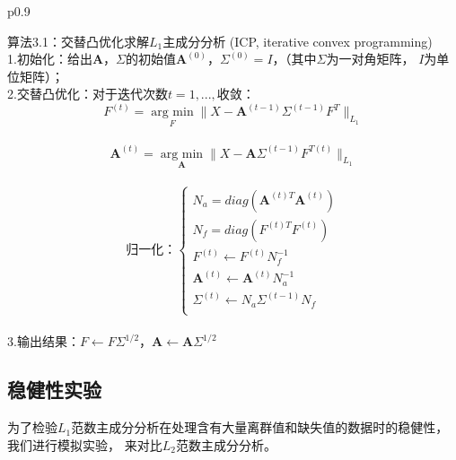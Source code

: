 \begin{table}[H]%
    \centering%
    \begin{tabular}{{p{0.9\columnwidth}}}%
    
    \toprule%
    算法3.1：交替凸优化求解$L_1$主成分分析 (ICP, iterative convex programming) \\
    \midrule%
    1.初始化：给出$\bm{A}$，$\Sigma$的初始值$\bm{A}^{(0)}$，$\Sigma^{(0)} = I$，（其中$\Sigma$为一对角矩阵，
    $I$为单位矩阵）； \\

    2.交替凸优化：对于迭代次数$t = 1, ..., $收敛： \\
    $$F^{(t)} = \underset{F}{\operatorname{arg\ min}} \|X - \bm{A}^{(t-1)}\Sigma^{(t-1)}F^{T}\|_{L_1}$$ \\
    $$\bm{A}^{(t)} = \underset{\bm{A}}{\operatorname{arg\ min}} \|X - \bm{A}\Sigma^{(t-1)}F^{T(t)} \|_{L_1}$$ \\
    \begin{equation*}
        \text{归一化：}\left\{
                    \begin{array}{clr}
                    N_a = diag(\bm{A}^{(t)T}\bm{A}^{(t)})\\
                    N_f = diag(F^{(t)T}F^{(t)})\\
                    F^{(t)} \leftarrow F^{(t)}N_f^{-1}\\
                    \bm{A}^{(t)}\leftarrow \bm{A}^{(t)}N_a^{-1}\\
                    \Sigma^{(t)} \leftarrow N_a\Sigma^{(t-1)}N_f\\
                    \end{array}
        \right.
    \end{equation*} \\

    3.输出结果：$F \leftarrow F\Sigma^{1/2}$，$\bm{A} \leftarrow \bm{A}\Sigma^{1/2}$ \\
    \bottomrule%
    \end{tabular}
\end{table}%

\subsection{稳健性实验}
为了检验$L_1$范数主成分分析在处理含有大量离群值和缺失值的数据时的稳健性，我们进行模拟实验，
来对比$L_2$范数主成分分析。

